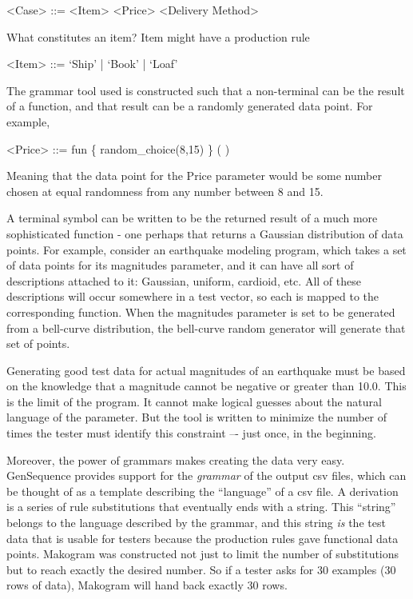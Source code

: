 \begin{grammar}
<Case> ::= <Item> <Price> <Delivery Method>
\end{grammar}

What constitutes an item? Item might have a production rule 
\begin{grammar}
<Item> ::= `Ship' | `Book' | `Loaf'
\end{grammar}

The grammar tool used is constructed such that a non-terminal can be the result of a function, and that result can be a randomly generated data point. For example,

\begin{grammar}
<Price> ::= fun \{ random_choice(8,15) \} ( )
\end{grammar}

Meaning that the data point for the Price parameter would be some number chosen at equal randomness from any number between 8 and 15.

A terminal symbol can be written to be the returned result of a much more sophisticated function - one perhaps that returns a Gaussian distribution of data points. For example, consider an earthquake modeling program, which takes a set of data points for its magnitudes parameter, and it can have all sort of descriptions attached to it: Gaussian, uniform, cardioid, etc. All of these descriptions will occur somewhere in a test vector, so each is mapped to the corresponding function. When the magnitudes parameter is set to be generated from a bell-curve distribution, the bell-curve random generator will generate that set of points.

Generating good test data for actual magnitudes of an earthquake must be based on the knowledge that a magnitude cannot be negative or greater than 10.0. This is the limit of the program. It cannot make logical guesses about the natural language of the parameter. But the tool is written to minimize the number of times the tester must identify this constraint –- just once, in the beginning.

Moreover, the power of grammars makes creating the data very easy. GenSequence provides support for the \textit{grammar} of the output csv files, which can be thought of as a template describing the ``language'' of a csv file. A derivation is a series of rule substitutions that eventually ends with a string. This ``string'' belongs to the language described by the grammar, and this string \textit{is} the test data that is usable for testers because the production rules gave functional data points. Makogram was constructed not just to limit the number of substitutions but to reach exactly the desired number. So if a tester asks for 30 examples (30 rows of data), Makogram will hand back exactly 30 rows.

